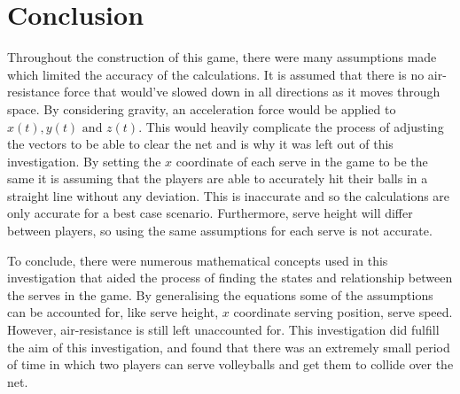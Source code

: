 \documentclass{article}
\begin{document}
														\section*{Conclusion}

														Throughout the construction of this game, there were many assumptions made which limited the accuracy of the calculations. It is assumed that there is no air-resistance force that would've slowed down in all directions as it moves through space. By considering gravity, an acceleration force would be applied to \(x(t), y(t) \text{ and } z(t)\). This would heavily complicate the process of adjusting the vectors to be able to clear the net and is why it was left out of this investigation. By setting the \(x\) coordinate of each serve in the game to be the same it is assuming that the players are able to accurately hit their balls in a straight line without any deviation. This is inaccurate and so the calculations are only accurate for a best case scenario. Furthermore, serve height will differ between players, so using the same assumptions for each serve is not accurate.

														To conclude, there were numerous mathematical concepts used in this investigation that aided the process of finding the states and relationship between the serves in the game. By generalising the equations some of the assumptions can be accounted for, like serve height, \(x\) coordinate serving position, serve speed. However, air-resistance is still left unaccounted for. This investigation did fulfill the aim of this investigation, and found that there was an extremely small period of time in which two players can serve volleyballs and get them to collide over the net.

														
														

														
\end{document}
